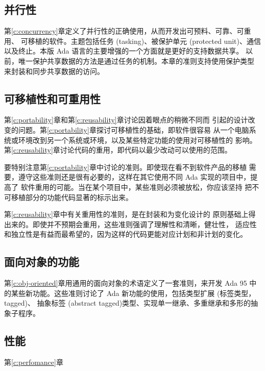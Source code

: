 \subsection{并行性}
第\ref{c:concurrency}章定义了并行性的正确使用，从而开发出可预料、可靠、可重用、
可移植的软件。主题包括任务 (tasking)、被保护单元 (protected unit)、通信
以及终止。本版 Ada 语言的主要增强的一个方面就是更好的支持数据共享。
以前，唯一保护共享数据的方法是通过任务的机制。本章的准则支持使用保护类型
来封装和同步共享数据的访问。

\subsection{可移植性和可重用性}
第\ref{c:portability}章和第\ref{c:reusability}章讨论因着眼点的稍微不同而
引起的设计改变的问题。第\ref{c:portability}章探讨可移植性的基础，即软件很容易
从一个电脑系统或环境改到另一个系统或环境，以及某些特定功能的使用对可移植性的
影响。第\ref{c:reusability}章讨论代码的重用，即代码以最少改动可以使用的范围。

要特别注意第\ref{c:portability}章中讨论的准则。即使现在看不到软件产品的移植
需要，遵守这些准则还是很有必要的，这样在其它使用不同 Ada 实现的项目中，提高了
软件重用的可能。当在某个项目中，某些准则必须被放松，你应该坚持
把不可移植部分的功能代码显著的标示出来。

第\ref{c:reusability}章中有关重用性的准则，是在封装和为变化设计的
原则基础上得出来的。即使并不预期会重用，这些准则强调了理解性和清晰，健壮性，
适应性和独立性是有益而最希望的，因为这样的代码更能对应计划和非计划的变化。

\subsection{面向对象的功能}
第\ref{c:obj-oriented}章用通用的面向对象的术语定义了一套准则，来开发 Ada 95 中
的某些新功能。这些准则讨论了 Ada 新功能的使用，包括类型扩展 (标签类型，tagged)、
抽象标签 (abstract tagged)类型、实现单一继承、多重继承和多形的抽象子程序。

\subsection{性能}
第\ref{c:perfomance}章
